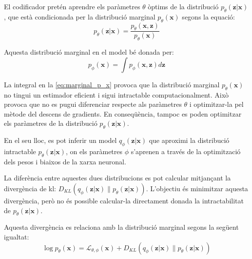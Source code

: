 \documentclass[CAT,BIB]{TFUOC}%
\begin{document}
        El codificador pretén aprendre els paràmetres $\theta$ òptims
        de la distribució $p_\theta(\mathbf{z|x})$,
        que està condicionada per la distribució marginal $p_\theta(\mathbf{x})$
        segons la equació:
        \begin{equation}
        \label{eq:cond_p_z_on_x}
            p_\theta(\mathbf{z|x}) =
            \frac {p_\theta(\mathbf{x,z})}
                  {p_\theta(\mathbf{x})}
        \end{equation}

        Aquesta distribució marginal en el model bé donada per:
        \begin{equation}
        \label{eq:marginal_p_x}
            p_\phi(\mathbf{x}) = \int p_\phi(\mathbf{x, z}) d\mathbf{z}
        \end{equation}

        La integral en la \cref{eq:marginal_p_x} provoca que
        la distribució marginal $p_\theta(\mathbf{x})$ no tingui un estimador eficient
        i sigui intractable computacionalment.
        Això provoca que no es pugui diferenciar respecte als paràmetres $\theta$
        i optimitzar-la pel mètode del descens de gradients.
        En conseqüència,
        tampoc es poden optimitzar els paràmetres de la distribució $p_\theta(\mathbf{z|x})$.

        En el seu lloc,
        es pot inferir un model $q_\phi(\mathbf{z|x})$
        que aproximi la distribució intractable $p_\theta(\mathbf{z|x})$,
        on els paràmetres $\phi$ s'aprenen a través de la optimització
        dels pesos i biaixos de la xarxa neuronal.

        La diferència entre aquestes dues distribucions
        es pot calcular mitjançant la divergència de \gls{kl}:
        $D_{KL} ( q_\phi(\mathbf{z|x}) \| p_\theta(\mathbf{z|x}) )$.
        L'objectiu és minimitzar aquesta divergència,
        però no és possible calcular-la directament
        donada la intractabilitat de $p_\theta(\mathbf{z|x})$.

        Aquesta divergència es relaciona amb la distribució marginal
        segons la següent igualtat:
        \begin{equation}
            \label{eq:kl}
            \log p_\theta(\mathbf{x}) =
            \mathcal{L}_{\theta,\phi}(\mathbf{x}) +
            D_{KL} (
            q_\phi(\mathbf{z|x}) \|
            p_\theta(\mathbf{z|x})
            )
        \end{equation}
\end{document}

